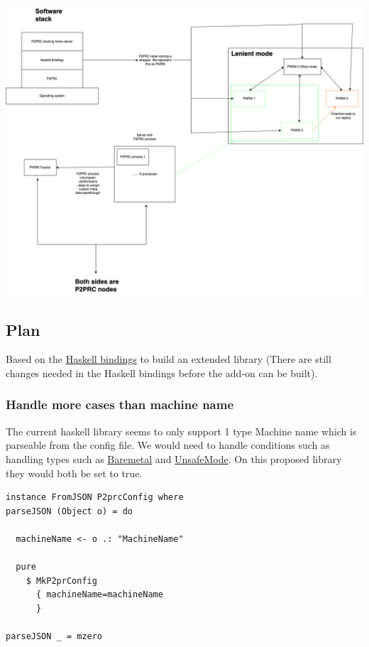 \documentclass[11pt]{article}
\begin{document}
\begin{center}
\includegraphics[width=.9\linewidth]{./P2PRC-Tracking-home-server.png}
\end{center}

\subsection{Plan}
\label{sec:org75ecafe}
Based on the \href{https://github.com/Akilan1999/p2p-rendering-computation/tree/master/haskell}{Haskell bindings} to build an extended library (There are still changes needed
in the Haskell bindings before the add-on can be built). 

\subsubsection{Handle more cases than machine name}
\label{sec:org7ed06ae}
The current haskell library seems to only support 1 type Machine name which is parseable from
the config file. We would need to handle conditions such as handling types such as \href{https://github.com/Akilan1999/p2p-rendering-computation/blob/67165d4bf63d82794a1a264edf843295b727c226/config/config.go\#L39}{Baremetal} and \href{https://github.com/Akilan1999/p2p-rendering-computation/blob/67165d4bf63d82794a1a264edf843295b727c226/config/config.go\#L40}{UnsafeMode}.
On this proposed library they would both be set to true. 
\begin{verbatim}
instance FromJSON P2prcConfig where
parseJSON (Object o) = do

  machineName <- o .: "MachineName"

  pure
    $ MkP2prConfig
      { machineName=machineName
      }

parseJSON _ = mzero
\end{verbatim}
\end{document}
